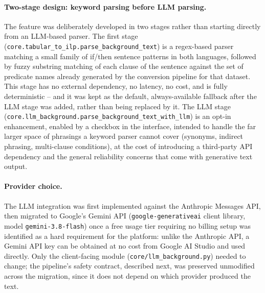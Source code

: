 \paragraph{Two-stage design: keyword parsing before LLM parsing.} The
feature was deliberately developed in two stages rather than starting
directly from an LLM-based parser. The first stage
(\texttt{core.tabular\_to\_ilp.parse\_background\_text}) is a
regex-based parser matching a small family of if/then sentence
patterns in both languages, followed by fuzzy substring matching of
each clause of the sentence against the set of predicate names already
generated by the conversion pipeline for that dataset. This stage has
no external dependency, no latency, no cost, and is fully
deterministic -- and it was kept as the default, always-available
fallback after the LLM stage was added, rather than being replaced by
it. The LLM stage
(\texttt{core.llm\_background.parse\_background\_text\_with\_llm}) is
an opt-in enhancement, enabled by a checkbox in the interface, intended
to handle the far larger space of phrasings a keyword parser cannot
cover (synonyms, indirect phrasing, multi-clause conditions), at the
cost of introducing a third-party API dependency and the general
reliability concerns that come with generative text output.

\paragraph{Provider choice.} The LLM integration was first implemented
against the Anthropic Messages API, then migrated to Google's Gemini
API (\texttt{google-generativeai} client library, model
\texttt{gemini-3.8-flash}) once a free usage tier requiring no billing
setup was identified as a hard requirement for the platform: unlike
the Anthropic API, a Gemini API key can be obtained at no cost from
Google AI Studio and used directly. Only the client-facing module
(\texttt{core/llm\_background.py}) needed to change; the pipeline's
safety contract, described next, was preserved unmodified across the
migration, since it does not depend on which provider produced the
text.

